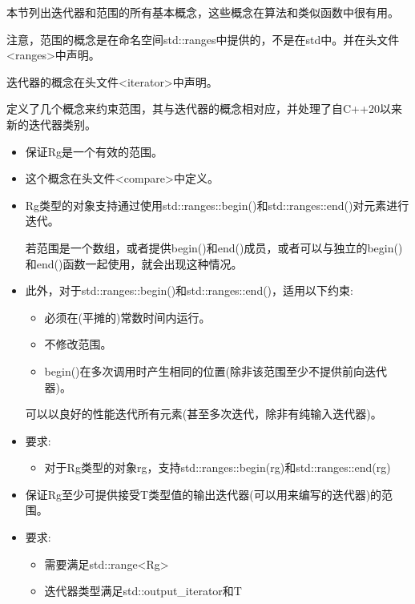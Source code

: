 
本节列出迭代器和范围的所有基本概念，这些概念在算法和类似函数中很有用。

注意，范围的概念是在命名空间std::ranges中提供的，不是在std中。并在头文件<ranges>中声明。

迭代器的概念在头文件<iterator>中声明。


定义了几个概念来约束范围，其与迭代器的概念相对应，并处理了自C++20以来新的迭代器类别。


\begin{itemize}
\item
保证Rg是一个有效的范围。

\item
这个概念在头文件<compare>中定义。

\item
Rg类型的对象支持通过使用std::ranges::begin()和std::ranges::end()对元素进行迭代。

若范围是一个数组，或者提供begin()和end()成员，或者可以与独立的begin()和end()函数一起使用，就会出现这种情况。

\item
此外，对于std::ranges::begin()和std::ranges::end()，适用以下约束:

\begin{itemize}
\item
必须在(平摊的)常数时间内运行。

\item
不修改范围。

\item
begin()在多次调用时产生相同的位置(除非该范围至少不提供前向迭代器)。
\end{itemize}

可以以良好的性能迭代所有元素(甚至多次迭代，除非有纯输入迭代器)。

\item
要求:

\begin{itemize}
\item
对于Rg类型的对象rg，支持std::ranges::begin(rg)和std::ranges::end(rg)
\end{itemize}
\end{itemize}


\begin{itemize}
\item
保证Rg至少可提供接受T类型值的输出迭代器(可以用来编写的迭代器)的范围。

\item
要求:

\begin{itemize}
\item
需要满足std::range<Rg>

\item
迭代器类型满足std::output\_iterator和T
\end{itemize}
\end{itemize}



